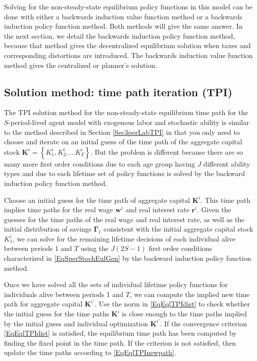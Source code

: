 \documentclass[letterpaper,12pt]{article}
\theoremstyle{definition}
\numberwithin{equation}{section}
\numberwithin{exercise}{section}
\begin{document}
      \begin{spacing}{1.5}

      Solving for the non-steady-state equilibrium policy functions in this model can be done with either a backwards induction value function method or a backwards induction policy function method. Both methods will give the same answer. In the next section, we detail the backwards induction policy function method, because that method gives the decentralized equilibrium solution when taxes and corresponding distortions are introduced. The backwards induction value function method gives the centralized or planner's solution.


   \subsection{Solution method: time path iteration (TPI)}\label{SecSperStochTPI}

      The TPI solution method for the non-steady-state equilibrium time path for the $S$-period-lived agent model with exogenous labor and stochastic ability is similar to the method described in Section \ref{Sec3perLabTPI} in that you only need to choose and iterate on an initial guess of the time path of the aggregate capital stock $\bm{K}^i = \left\{K_1^i,K_2^i,...K_T^i\right\}$. But the problem is different because there are so many more first order conditions due to each age group having $J$ different ability types and due to each lifetime set of policy functions is solved by the backward induction policy function method.

      Choose an initial guess for the time path of aggregate capital $\bm{K}^i$. This time path implies time paths for the real wage $\bm{w}^i$ and real interest rate $\bm{r}^i$. Given the guesses for the time paths of the real wage and real interest rate, as well as the initial distribution of savings $\bm{\Gamma}_1$ consistent with the initial aggregate capital stock $K_1^i$, we can solve for the remaining lifetime decisions of each individual alive between periods 1 and $T$ using the $J(2S-1)$ first order conditions characterized in \eqref{EqSperStochEulGen} by the backward induction policy function method.

      Once we have solved all the sets of individual lifetime policy functions for individuals alive between periods 1 and $T$, we can compute the implied new time path for aggregate capital $\bm{K}^{i'}$. Use the norm in \eqref{EqEqlTPIdist} to check whether the initial guess for the time paths $\bm{K}^{i}$ is close enough to the time paths implied by the initial guess and individual optimization $\bm{K}^{i'}$. If the convergence criterion \eqref{EqEqlTPIdist} is satisfied, the equilibrium time path has been computed by finding the fixed point in the time path. If the criterion is not satisfied, then update the time paths according to \eqref{EqEqlTPInewpath}.


\end{spacing}
\end{document}
